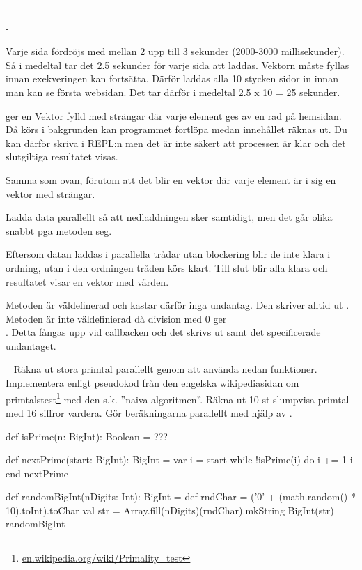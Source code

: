 \SubtaskSolved  -

\SubtaskSolved  -

\SubtaskSolved  Varje sida fördröjs med mellan 2 upp till 3 sekunder (2000-3000 millisekunder). Så i medeltal tar det 2.5 sekunder för varje sida att laddas. Vektorn måste fyllas innan exekveringen kan fortsätta. Därför laddas alla 10 stycken sidor in innan man kan se första websidan. Det tar därför i medeltal 2.5 x 10 = 25 sekunder.

\SubtaskSolved  {} ger en Vektor fylld med strängar där varje element ges av en rad på hemsidan. Då  körs i bakgrunden kan programmet fortlöpa medan innehållet räknas ut. Du kan därför skriva  i REPL:n men det är inte säkert att processen är klar och det slutgiltiga resultatet visas.

\SubtaskSolved  Samma som ovan, förutom att det blir en vektor där varje element är i sig en vektor med strängar.

\SubtaskSolved  Ladda data parallellt så att nedladdningen sker samtidigt, men det går olika snabbt pga metoden seg.

\SubtaskSolved  Eftersom datan laddas i parallella trådar utan blockering blir de inte klara i ordning, utan i den ordningen tråden körs klart. Till slut blir alla klara och resultatet visar en vektor med  värden.

\SubtaskSolved  Metoden  är väldefinerad och kastar därför inga undantag. Den skriver alltid ut \code{:)}. Metoden  är inte väldefinierad då division med 0 ger \\. Detta fångas upp vid callbacken och det skrivs ut \code{:(} samt det specificerade undantaget.

\ExtraTasks %


\QUESTEND






\WHAT{}

\QUESTBEGIN

\Task  \what~ Räkna ut stora primtal parallellt genom att använda nedan funktioner. Implementera  enligt pseudokod från den engelska wikipediasidan om primtalstest\footnote{\href{https://en.wikipedia.org/wiki/Primality_test}{en.wikipedia.org/wiki/Primality\_test}} med den s.k. ''naiva algoritmen''.  Räkna ut 10 st slumpvisa primtal med 16 siffror vardera. Gör beräkningarna parallellt med hjälp av .

\begin{Code}
def isPrime(n: BigInt): Boolean = ???

def nextPrime(start: BigInt): BigInt = 
  var i = start
  while !isPrime(i) do i += 1 
  i
end nextPrime

def randomBigInt(nDigits: Int): BigInt = 
   def rndChar = ('0' + (math.random() * 10).toInt).toChar
   val str = Array.fill(nDigits)(rndChar).mkString
   BigInt(str)
randomBigInt
\end{Code}

